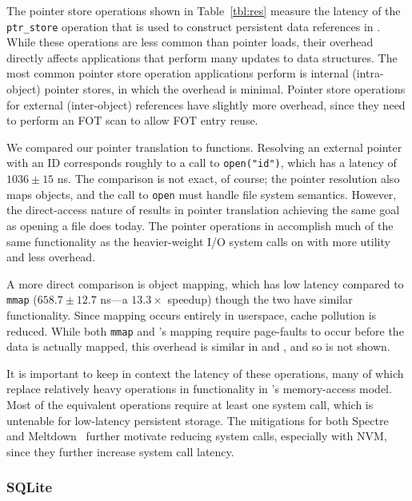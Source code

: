 The pointer store operations shown in Table~\ref{tbl:res} measure the latency of the
\texttt{ptr\_store} operation that is used to construct persistent data references in \Twizzler.
While these operations are less common than pointer loads, their overhead directly affects
applications that perform many updates to data structures.
The most common pointer store operation applications perform is internal (intra-object) pointer stores, in which the
overhead is minimal. Pointer store operations for external (inter-object) references have slightly
more overhead, since they need to perform an FOT scan to allow FOT entry reuse.



We compared our pointer translation to \unix functions.
Resolving an external pointer with an ID corresponds roughly
to a call to \texttt{open("id")}, which has a latency of $1036 \pm 15$ ns.
The comparison is not exact, of course; the pointer resolution
also maps objects, and the call to \texttt{open} must handle file system
semantics. However, the direct-access nature of \NVM results in pointer translation
achieving the same goal as opening a file does today. The pointer operations in \Twizzler accomplish
much of the same functionality as the heavier-weight I/O system calls on \unix with more utility and
less overhead.

A more direct comparison is object mapping, which has
low latency compared to \texttt{mmap} ($658.7 \pm 12.7$ ns---a $13.3\times$ speedup) though the two have similar
functionality. Since mapping occurs entirely
in userspace, cache pollution is reduced.
While both \texttt{mmap} and \Twizzler's mapping require
page-faults to occur before the data is actually mapped,
this overhead is similar in \Twizzler and \unix, and so is not
shown.


It is important to keep in context the latency of these operations, many of which
replace relatively heavy \unix operations in functionality in \Twizzler's memory-access
model. Most of the equivalent \unix operations require
at least one system call, which is untenable for low-latency persistent
storage.
The mitigations for both Spectre~\cite{spectre} and
Meltdown~\cite{meltdown} further motivate reducing system calls, especially with
NVM, since they further increase system call latency.


\subsubsection{SQLite}

